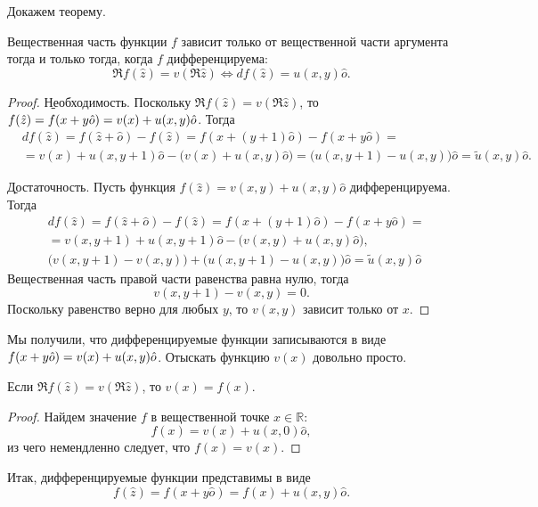 Докажем теорему.
\begin{theorem} 
	Вещественная часть функции $f$ зависит только от вещественной части аргумента тогда и только тогда, когда $f$ дифференцируема:
		\begin{equation}
			\Re{f(\hat{z})}=v(\Re{\hat{z}})\Leftrightarrow df(\hat{z})=u(x, y)\hat{o}.
		\end{equation}
\end{theorem}
\begin{proof}

	\b{Необходимость.} Поскольку $\Re{f(\hat{z})}=v(\Re{\hat{z}})$, то $f(\hat{z})\hm=f(x+y\hat{o})\hm=v(x)+u(x, y)\hat{o}$. Тогда
		\begin{eqnarray*}
			& df(\hat{z})=f(\hat{z}+\hat{o})-f(\hat{z})=f(x+(y+1)\hat{o})-f(x+y\hat{o})=\\
			& =v(x)+u(x, y+1)\hat{o}-\big(v(x)+u(x, y)\hat{o}\big)=\big(u(x, y+1)-u(x, y)\big)\hat{o}=\tilde{u}(x, y)\hat{o}.
		\end{eqnarray*}

	\b{Достаточность.} Пусть функция $f(\hat{z})=v(x, y)+u(x, y)\hat{o}$ дифференцируема. Тогда
		\begin{eqnarray*}
			& df(\hat{z})=f(\hat{z}+\hat{o})-f(\hat{z})=f(x+(y+1)\hat{o})-f(x+y\hat{o})=\\
			& =v(x, y+1)+u(x, y+1)\hat{o}-\big(v(x, y)+u(x, y)\hat{o}\big), \\
			& \big(v(x, y+1)-v(x, y)\big)+\big(u(x, y+1)-u(x, y)\big)\hat{o}=\tilde{u}(x, y)\hat{o}
		\end{eqnarray*}
		Вещественная часть правой части равенства равна нулю, тогда
			$$v(x, y+1)-v(x, y)=0.$$
		Поскольку равенство верно для любых $y$, то $v(x, y)$ зависит только от $x$.
\end{proof}

Мы получили, что дифференцируемые функции записываются в виде $f(x+y\hat{o})\hm=v(x)+u(x, y)\hat{o}$. Отыскать функцию $v(x)$ довольно просто.
\begin{theorem}
	Если $\Re{f(\hat{z})}=v(\Re{\hat{z}})$, то $v(x)=f(x)$.
\end{theorem}
\begin{proof}
	Найдем значение $f$ в вещественной точке $x\in\mathbb{R}$:
		$$f(x)=v(x)+u(x, 0)\hat{o},$$
	из чего немендленно следует, что $f(x)=v(x)$.
\end{proof}

Итак, дифференцируемые функции представимы в виде
	\begin{equation}
		f(\hat{z})=f(x+y\hat{o})=f(x)+u(x, y)\hat{o}.
	\end{equation}